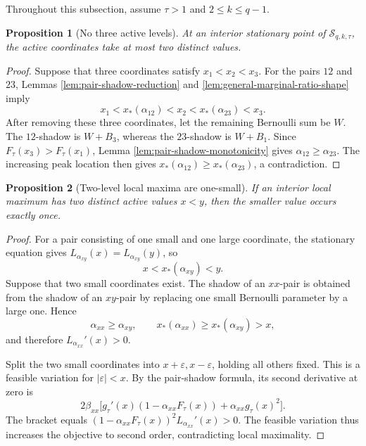 \documentclass[11pt]{article}
\newtheorem{proposition}{Proposition}
\theoremstyle{definition}
\theoremstyle{remark}
\newcommand{\1}{\mathbf 1}
\begin{document}
Throughout this subsection, assume \(\tau>1\) and \(2\le k\le q-1\).

\begin{proposition}[No three active levels]
\label{prop:no-three-active-levels}
At an interior stationary point of \(\mathcal S_{q,k,\tau}\), the active coordinates take at most two distinct values.
\end{proposition}

\begin{proof}
Suppose that three coordinates satisfy \(x_1<x_2<x_3\).  For the pairs \(12\) and \(23\), Lemmas \ref{lem:pair-shadow-reduction} and \ref{lem:general-marginal-ratio-shape} imply
\[
  x_1<x_*(\alpha_{12})<x_2
  <x_*(\alpha_{23})<x_3.
\]
After removing these three coordinates, let the remaining Bernoulli sum be \(W\).  The \(12\)-shadow is \(W+B_3\), whereas the \(23\)-shadow is \(W+B_1\).  Since \(F_\tau(x_3)>F_\tau(x_1)\), Lemma \ref{lem:pair-shadow-monotonicity} gives
\(\alpha_{12}\ge\alpha_{23}\).  The increasing peak location then gives
\(x_*(\alpha_{12})\ge x_*(\alpha_{23})\), a contradiction.
\end{proof}

\begin{proposition}[Two-level local maxima are one-small]
\label{prop:two-level-one-small}
If an interior local maximum has two distinct active values \(x<y\), then the smaller value occurs exactly once.
\end{proposition}

\begin{proof}
For a pair consisting of one small and one large coordinate, the stationary equation gives
\(L_{\alpha_{xy}}(x)=L_{\alpha_{xy}}(y)\), so
\[
  x<x_*(\alpha_{xy})<y.
\]
Suppose that two small coordinates exist.  The shadow of an \(xx\)-pair is obtained from the shadow of an \(xy\)-pair by replacing one small Bernoulli parameter by a large one.  Hence
\[
  \alpha_{xx}\ge\alpha_{xy},
  \qquad x_*(\alpha_{xx})\ge x_*(\alpha_{xy})>x,
\]
and therefore \(L_{\alpha_{xx}}'(x)>0\).

Split the two small coordinates into \(x+\varepsilon,x-\varepsilon\), holding all others fixed.  This is a feasible variation for \(|\varepsilon|<x\).  By the pair-shadow formula, its second derivative at zero is
\[
  2\beta_{xx}\bigl[
       g_\tau'(x)(1-\alpha_{xx}F_\tau(x))
       +\alpha_{xx}g_\tau(x)^2\bigr].
\]
The bracket equals
\((1-\alpha_{xx}F_\tau(x))^2L_{\alpha_{xx}}'(x)>0\).
The feasible variation thus increases the objective to second order, contradicting local maximality.
\end{proof}
\end{document}
